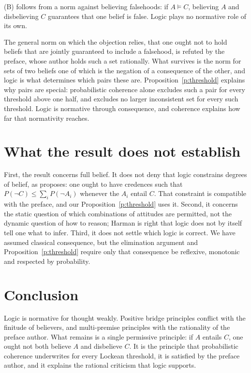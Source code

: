 \documentclass{situationist-preprint}
\begin{document}
\begin{objection}
(B) follows from a norm against believing falsehoods: if $A \models C$, believing $A$ and disbelieving $C$ guarantees that one belief is false. Logic plays no normative role of its own.
\end{objection}

\begin{reply}
The general norm on which the objection relies, that one ought not to hold beliefs that are jointly guaranteed to include a falsehood, is refuted by the preface, whose author holds such a set rationally. What survives is the norm for sets of two beliefs one of which is the negation of a consequence of the other, and logic is what determines which pairs these are. Proposition~\ref{p:threshold} explains why pairs are special: probabilistic coherence alone excludes such a pair for every threshold above one half, and excludes no larger inconsistent set for every such threshold. Logic is normative through consequence, and coherence explains how far that normativity reaches.
\end{reply}

\section{What the result does not establish}

First, the result concerns full belief. It does not deny that logic constrains degrees of belief, as \citet{Field2009} proposes: one ought to have credences such that $P(\neg C) \leq \sum_i P(\neg A_i)$ whenever the $A_i$ entail $C$. That constraint is compatible with the preface, and our Proposition~\ref{p:threshold} uses it. Second, it concerns the static question of which combinations of attitudes are permitted, not the dynamic question of how to reason; Harman is right that logic does not by itself tell one what to infer. Third, it does not settle which logic is correct. We have assumed classical consequence, but the elimination argument and Proposition~\ref{p:threshold} require only that consequence be reflexive, monotonic and respected by probability.

\section{Conclusion}

Logic is normative for thought weakly. Positive bridge principles conflict with the finitude of believers, and multi-premise principles with the rationality of the preface author. What remains is a single permissive principle: if $A$ entails $C$, one ought not both believe $A$ and disbelieve $C$. It is the principle that probabilistic coherence underwrites for every Lockean threshold, it is satisfied by the preface author, and it explains the rational criticism that logic supports.
\end{document}
